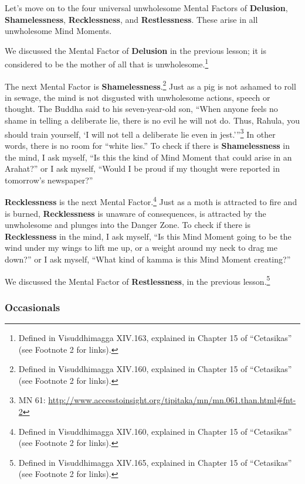 Let’s move on to the four universal unwholesome Mental Factors of \textbf{Delusion}, \textbf{Shamelessness}, \textbf{Recklessness}, and \textbf{Restlessness}. These arise in all unwholesome Mind Moments.

We discussed the Mental Factor of \textbf{Delusion} in the previous lesson; it is considered to be the mother of all that is unwholesome.\footnote{Defined in Visuddhimagga XIV.163, explained in Chapter 15 of “Cetasikas” (see Footnote 2 for links).}

The next Mental Factor is \textbf{Shamelessness}.\footnote{Defined in Visuddhimagga XIV.160, explained in Chapter 15 of “Cetasikas” (see Footnote 2 for links).} Just as a pig is not ashamed to roll in sewage, the mind is not disgusted with unwholesome actions, speech or thought. The Buddha said to his seven-year-old son, “When anyone feels no shame in telling a deliberate lie, there is no evil he will not do. Thus, Rahula, you should train yourself, `I will not tell a deliberate lie even in jest.’”\footnote{MN 61: \url{http://www.accesstoinsight.org/tipitaka/mn/mn.061.than.html\#fnt-2}} In other words, there is no room for “white lies.” To check if there is \textbf{Shamelessness} in the mind, I ask myself, “Is this the kind of Mind Moment that could arise in an Arahat?” or I ask myself, “Would I be proud if my thought were reported in tomorrow’s newspaper?”

\textbf{Recklessness} is the next Mental Factor.\footnote{Defined in Visuddhimagga XIV.160, explained in Chapter 15 of “Cetasikas” (see Footnote 2 for links).} Just as a moth is attracted to fire and is burned, \textbf{Recklessness} is unaware of consequences, is attracted by the unwholesome and plunges into the Danger Zone. To check if there is \textbf{Recklessness} in the mind, I ask myself, “Is this Mind Moment going to be the wind under my wings to lift me up, or a weight around my neck to drag me down?” or I ask myself, “What kind of kamma is this Mind Moment creating?”

We discussed the Mental Factor of \textbf{Restlessness}, in the previous lesson.\footnote{Defined in Visuddhimagga XIV.165, explained in Chapter 15 of “Cetasikas” (see Footnote 2 for links).}

\subsubsection*{Occasionals}

